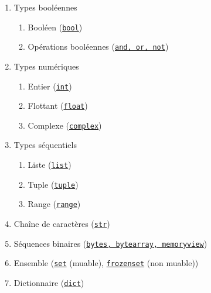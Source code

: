 \documentclass[a4paper, 10pt]{article}
\begin{document}
\begin{enumerate}
		\item Types booléennes
		\begin{enumerate}
			\item Booléen (\href{https://docs.python.org/fr/3/library/functions.html?highlight=bool#bool}{\texttt{bool}})
			\item Opérations booléennes (\href{https://docs.python.org/fr/3/library/stdtypes.html#boolean-operations-and-or-not}{\texttt{and, or, not}})
		\end{enumerate}
        \item Types numériques
        \begin{enumerate}
              \item Entier (\href{https://docs.python.org/fr/3/library/stdtypes.html#typesnumeric}{\texttt{int}})
              \item Flottant (\href{https://docs.python.org/fr/3/library/stdtypes.html#typesnumeric}{\texttt{float}})
              \item Complexe (\href{https://docs.python.org/fr/3/library/stdtypes.html#typesnumeric}{\texttt{complex}})
      \end{enumerate}
     \item Types séquentiels
	\begin{enumerate}
       \item Liste (\href{https://docs.python.org/fr/3/library/stdtypes.html#sequence-types-list-tuple-range}{\texttt{list}})
		\item Tuple (\href{https://docs.python.org/fr/3/library/stdtypes.html#sequence-types-list-tuple-range}{\texttt{tuple}})
		\item Range (\href{https://docs.python.org/fr/3/library/stdtypes.html#sequence-types-list-tuple-range}{\texttt{range}})
	\end{enumerate}
        \item Chaîne de caractères (\href{https://docs.python.org/fr/3/library/string.html?highlight=str#module-string}{\texttt{str}})
		\item Séquences binaires (\href{https://docs.python.org/fr/3/library/stdtypes.html#binary-sequence-types-bytes-bytearray-memoryview}{\texttt{bytes, bytearray, memoryview}})
		\item Ensemble (\href{https://docs.python.org/fr/3/library/stdtypes.html#set-types-set-frozenset}{\texttt{set}} (muable), \href{https://docs.python.org/fr/3/library/stdtypes.html#set-types-set-frozenset}{\texttt{frozenset}} (non muable))
		\item Dictionnaire (\href{https://docs.python.org/fr/3/library/stdtypes.html#mapping-types-dict}{\texttt{dict}})
\end{enumerate}
\end{document}
